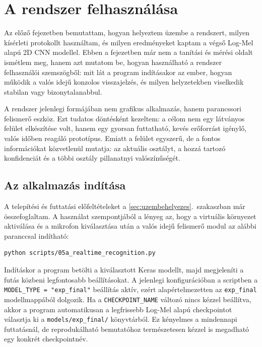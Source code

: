 \chapter{A rendszer felhasználása}
\label{chap:felhasznalas}

Az előző fejezetben bemutattam, hogyan helyeztem üzembe a rendszert, milyen kísérleti protokollt használtam, és milyen eredményeket kaptam a végső Log-Mel alapú 2D CNN modellel. Ebben a fejezetben már nem a tanítási és mérési oldalt ismétlem meg, hanem azt mutatom be, hogyan használható a rendszer felhasználói szemszögből: mit lát a program indításakor az ember, hogyan működik a valós idejű konzolos visszajelzés, és milyen helyzetekben viselkedik stabilan vagy bizonytalanabbul.

A rendszer jelenlegi formájában nem grafikus alkalmazás, hanem parancssori felismerő eszköz. Ezt tudatos döntésként kezeltem: a célom nem egy látványos felület elkészítése volt, hanem egy gyorsan futtatható, kevés erőforrást igénylő, valós időben reagáló prototípus. Emiatt a felület egyszerű, de a fontos információkat közvetlenül mutatja: az aktuális osztályt, a hozzá tartozó konfidenciát és a többi osztály pillanatnyi valószínűségét.

\section{Az alkalmazás indítása}
\label{sec:inditas}

A telepítési és futtatási előfeltételeket a \ref{sec:uzembehelyezes}.~szakaszban már összefoglaltam. A használat szempontjából a lényeg az, hogy a virtuális környezet aktiválása és a mikrofon kiválasztása után a valós idejű felismerő modul az alábbi paranccsal indítható:

\begin{lstlisting}
python scripts/05a_realtime_recognition.py
\end{lstlisting}

Indításkor a program betölti a kiválasztott Keras modellt, majd megjeleníti a futás közbeni legfontosabb beállításokat. A jelenlegi konfigurációban a scriptben a \texttt{MODEL\_TYPE = "exp\_final"} beállítás aktív, ezért alapértelmezetten az \texttt{exp\_final} modellmappából dolgozik. Ha a \texttt{CHECKPOINT\_NAME} változó nincs kézzel beállítva, akkor a program automatikusan a legfrissebb Log-Mel alapú checkpointot választja ki a \texttt{models/exp\_final/} könyvtárból. Ez kényelmes a mindennapi futtatásnál, de reprodukálható bemutatóhoz természetesen kézzel is megadható egy konkrét checkpointnév.

